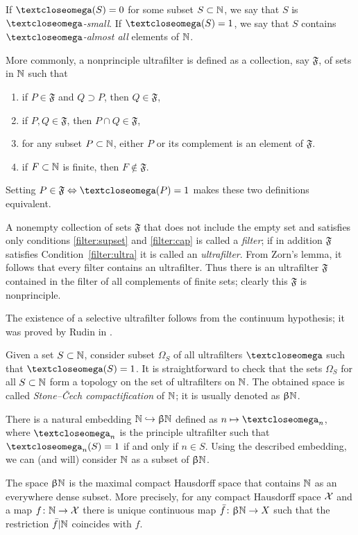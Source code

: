 If $\o(S)=0$ for some subset $S\subset \NN$,
we say that $S$ is \emph{$\o$-small}. 
If $\o(S)=1$, we say that $S$ contains \emph{$\o$-almost all} elements of $\mathbb{N}$.

More commonly, a nonprinciple ultrafilter is defined as a collection, say $\mathfrak{F}$, of sets in $\mathbb{N}$ such that
\begin{enumerate}
\item\label{filter:supset} if $P\in \mathfrak{F}$ and $Q\supset P$, then $Q\in \mathfrak{F}$,
\item\label{filter:cap} if $P, Q\in \mathfrak{F}$, then $P\cap Q\in \mathfrak{F}$,
\item\label{filter:ultra} for any subset $P\subset\NN$, either $P$ or its complement is an element of $\mathfrak{F}$.
\item\label{filter:non-prin} if $F\subset \NN $ is finite, then $F\notin \mathfrak{F}$.
\end{enumerate}
Setting $P\in\mathfrak{F}\Leftrightarrow\o(P)=1$ makes these two definitions equivalent.

A nonempty collection of sets $\mathfrak{F}$ that does not include the empty set and satisfies only conditions \ref{filter:supset} and \ref{filter:cap} is called a \emph{filter}; 
if in addition $\mathfrak{F}$ satisfies Condition~\ref{filter:ultra} it is called an \emph{ultrafilter}.
From Zorn's lemma, it follows that every filter contains an ultrafilter.
Thus there is an ultrafilter $\mathfrak{F}$ contained in the filter of all complements of finite sets; clearly this $\mathfrak{F}$ is nonprinciple.

The existence of a selective ultrafilter follows from the continuum hypothesis;
it was proved by  Rudin in \cite{rudin}.

Given a set $S\subset \NN$, consider subset $\Omega_S$ of all ultrafilters $\o$ such that $\o(S)=1$.
It is straightforward to check that the sets $\Omega_S$ for all $S\subset \NN$ form a topology on the set of ultrafilters on $\mathbb{N}$. 
The obtained space is called \emph{Stone--\v{C}ech compactification} of $\mathbb{N}$;
it is usually denoted as $\upbeta\mathbb{N}$.

There is a natural embedding $\NN\hookrightarrow\beta\NN$ defined as
$n\mapsto\o_n$, where $\o_n$ is the principle ultrafilter such that $\o_n(S)=1$ if and only if $n\in S$. 
Using the described embedding, we can (and will) consider $\mathbb{N}$ as a subset of $\upbeta\mathbb{N}$.

The space $\upbeta\mathbb{N}$ is the maximal compact Hausdorff space that contains $\mathbb{N}$  as an everywhere dense subset.
More precisely, for any compact Hausdorff space $\mathcal{X}$ 
and a map $f\:\NN\to \spc{X}$ there is unique continuous map $\bar f\:\beta\NN\to X$ such that the restriction $\bar f|\mathbb{N}$ coincides with $f$. 


